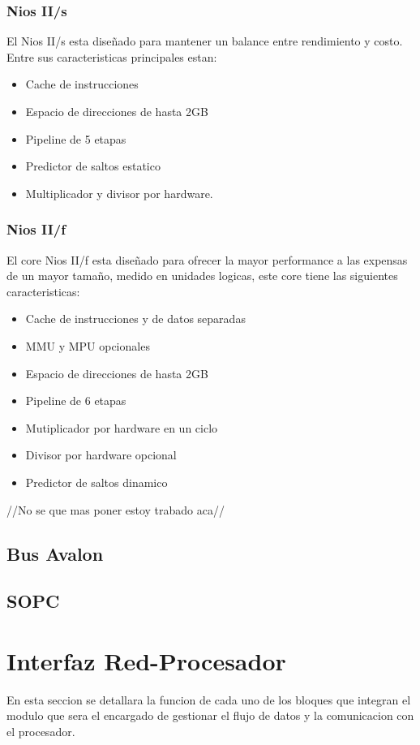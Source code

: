 \subsubsection{Nios II/s}
El Nios II/s esta diseñado para mantener un balance entre rendimiento y costo. Entre sus caracteristicas principales estan:

\begin{itemize}
	\item Cache de instrucciones
	\item Espacio de direcciones de hasta 2GB
	\item Pipeline de 5 etapas
	\item Predictor de saltos estatico
	\item Multiplicador y divisor por hardware. 
\end{itemize}



\subsubsection{Nios II/f}
El core Nios II/f esta diseñado para ofrecer la mayor performance a las expensas de un mayor tamaño, medido en unidades logicas, este core tiene las siguientes caracteristicas:

\begin{itemize}
	\item Cache de instrucciones y de datos separadas
	\item MMU y MPU opcionales
	\item Espacio de direcciones de hasta 2GB
	\item Pipeline de 6 etapas
	\item Mutiplicador por hardware en un ciclo
	\item Divisor por hardware opcional
	\item Predictor de saltos dinamico
\end{itemize}


//No se que mas poner estoy trabado aca//


\subsection{Bus Avalon}

\subsection{SOPC}


\section{Interfaz Red-Procesador}
En esta seccion se detallara la funcion de cada uno de los bloques que integran el modulo que sera el encargado de gestionar el flujo de datos y la comunicacion con el procesador. 


